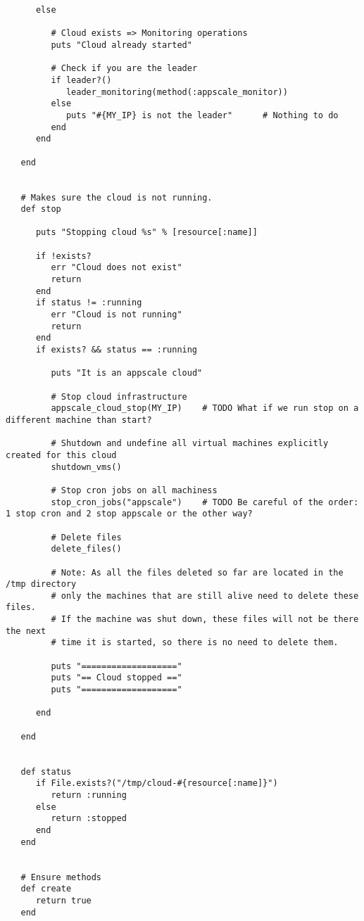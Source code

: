 \begin{lstlisting}
      else
         
         # Cloud exists => Monitoring operations
         puts "Cloud already started"
         
         # Check if you are the leader
         if leader?()
            leader_monitoring(method(:appscale_monitor))
         else
            puts "#{MY_IP} is not the leader"      # Nothing to do
         end
      end
      
   end


   # Makes sure the cloud is not running.
   def stop

      puts "Stopping cloud %s" % [resource[:name]]

      if !exists?
         err "Cloud does not exist"
         return
      end
      if status != :running
         err "Cloud is not running"
         return
      end
      if exists? && status == :running
         
         puts "It is an appscale cloud"
         
         # Stop cloud infrastructure
         appscale_cloud_stop(MY_IP)    # TODO What if we run stop on a different machine than start?
         
         # Shutdown and undefine all virtual machines explicitly created for this cloud
         shutdown_vms()
         
         # Stop cron jobs on all machiness
         stop_cron_jobs("appscale")    # TODO Be careful of the order: 1 stop cron and 2 stop appscale or the other way?
         
         # Delete files
         delete_files()
         
         # Note: As all the files deleted so far are located in the /tmp directory
         # only the machines that are still alive need to delete these files.
         # If the machine was shut down, these files will not be there the next
         # time it is started, so there is no need to delete them.
         
         puts "==================="
         puts "== Cloud stopped =="
         puts "==================="
         
      end
   
   end


   def status
      if File.exists?("/tmp/cloud-#{resource[:name]}")
         return :running
      else
         return :stopped
      end
   end


   # Ensure methods
   def create
      return true
   end
   


\end{lstlisting}
